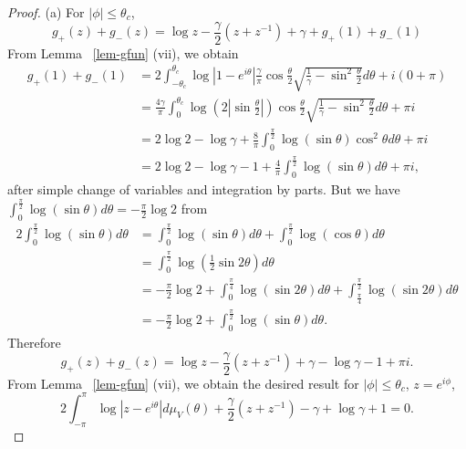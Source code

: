 \documentclass{amsart}
\theoremstyle{definition}
\theoremstyle{remark}
\numberwithin{equation}{section}
\begin{document}
\begin{proof}
  (a) For $|\phi| \le \theta_c$,
  \begin{equation*}
    g_+(z)+g_-(z)=\log{z} -\frac{\gamma}2(z+z^{-1}) +\gamma +g_+(1)+g_-(1)
  \end{equation*}
  From Lemma ~\ref{lem-gfun} (vii), we obtain 
  \begin{equation*} 
    \begin{split}
      g_+(1)+g_-(1)&= 2\int_{-\theta_c}^{\theta_c} \log|1-e^{i\theta}| 
\frac{\gamma}{\pi} \cos{\frac{\theta}2} \sqrt{\frac1{\gamma} 
-\sin^2 \frac{\theta}2} d\theta +i(0+\pi)\\
      &= \frac{4\gamma}{\pi} \int_{0}^{\theta_c} \log(2|\sin{\frac{\theta}2}|)
\cos{\frac{\theta}2} \sqrt{\frac1{\gamma} -\sin^2 \frac{\theta}2} d\theta +\pi i\\
      &= 2\log{2} -\log{\gamma} +\frac8{\pi} \int_{0}^{\frac{\pi}2}
\log(\sin{\theta}) \cos^2 \theta d\theta +\pi i\\
      &= 2\log{2} -\log{\gamma} -1 +\frac4{\pi} \int_{0}^{\frac{\pi}2}
\log(\sin{\theta}) d\theta +\pi i,
    \end{split}
  \end{equation*}
 after simple change of variables and integration by parts.
  But we have $\int_{0}^{\frac{\pi}2} \log(\sin{\theta}) d\theta 
= -\frac{\pi}2 \log{2}$ from
   \begin{equation*}  
    \begin{split}
      2\int_{0}^{\frac{\pi}2} \log(\sin{\theta}) d\theta 
      &= \int_{0}^{\frac{\pi}2} \log(\sin{\theta}) d\theta 
+ \int_{0}^{\frac{\pi}2} \log(\cos{\theta}) d\theta \\
      &= \int_{0}^{\frac{\pi}2} \log(\frac12 \sin{2\theta}) d\theta \\
      &=-\frac{\pi}2 \log{2} 
+ \int_{0}^{\frac{\pi}4} \log(\sin{2\theta}) d\theta 
+ \int_{\frac{\pi}4}^{\frac{\pi}2} \log(\sin{2\theta}) d\theta \\
      &=-\frac{\pi}2 \log{2} +\int_{0}^{\frac{\pi}2} \log(\sin{\theta}) d\theta.
    \end{split}
  \end{equation*}
  Therefore  
$$g_+(z)+g_-(z)=\log{z} -\frac{\gamma}2(z+z^{-1})+\gamma-\log{\gamma}-1+\pi i.$$
  From Lemma ~\ref{lem-gfun} (vii), we obtain the desired result 
for $|\phi| \le \theta_c$, $z=e^{i\phi}$,
  \begin{equation*}
    2\int_{-\pi}^{\pi}\log |z-e^{i\theta}| d\mu_V(\theta)
+ \frac{\gamma}2(z+z^{-1}) -\gamma +\log\gamma +1 =0.
  \end{equation*}


\end{proof}
\end{document}
